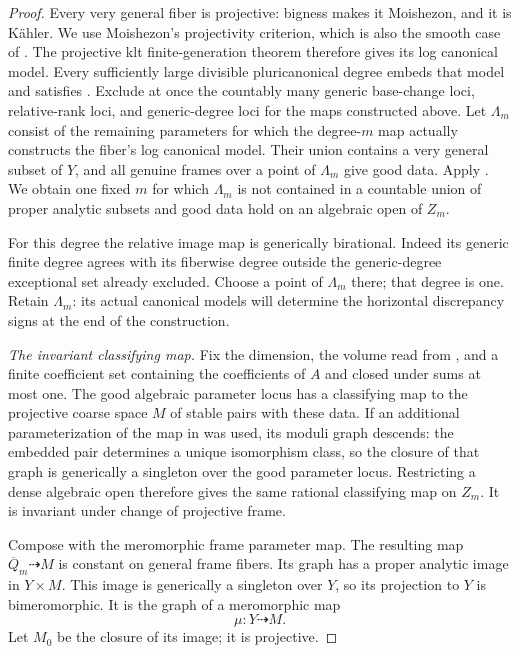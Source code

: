 \begin{proof}
Every very general fiber is projective: bigness makes it Moishezon,
and it is Kähler. We use Moishezon's projectivity criterion, which
is also the smooth case of \cite[Theorem~6]{NamikawaProjectivity}.
The projective klt finite-generation theorem
\cite[Theorem~1.1 and its consequences]{BCHM} therefore gives its log
canonical model.  Every sufficiently large divisible pluricanonical
degree embeds that model and satisfies
.  Exclude at once the countably
many generic base-change loci, relative-rank loci, and generic-degree
loci for the maps constructed above.  Let \(\Lambda_m\) consist of
the remaining parameters for which the degree-\(m\) map actually
constructs the fiber's log canonical model.
Their union contains a very general subset of \(Y\), and all genuine
frames over a point of \(\Lambda_m\) give good data.
Apply .  We obtain one fixed \(m\) for which
\(\Lambda_m\) is not contained in a countable union of proper analytic
subsets and good data hold on an algebraic open of \(Z_m\).

For this degree the relative image map is generically birational.
Indeed its generic finite degree agrees with its fiberwise degree
outside the generic-degree exceptional set already excluded.
Choose a point of \(\Lambda_m\) there; that degree is one.
Retain \(\Lambda_m\): its actual canonical models will determine the
horizontal discrepancy signs at the end of the construction.

\emph{The invariant classifying map.}
Fix the dimension, the volume read from
, and a finite coefficient set
containing the coefficients of \(A\) and closed under sums at most one.
The good algebraic parameter locus has a classifying map to the
projective coarse space \(M\) of stable pairs with these data.
If an additional parameterization of the map in
 was used, its moduli graph descends:
the embedded pair determines a unique isomorphism class, so the
closure of that graph is generically a singleton over the good
parameter locus.  Restricting a dense algebraic open therefore gives
the same rational classifying map on \(Z_m\).
It is invariant under change of projective frame.

Compose with the meromorphic frame parameter map.
The resulting map \(\overline Q_m\dashrightarrow M\) is constant
on general frame fibers.  Its graph has a proper analytic image
in \(Y\times M\).  This image is generically a singleton over \(Y\),
so its projection to \(Y\) is bimeromorphic.  It is the graph of
a meromorphic map
\[
  \mu\colon Y\dashrightarrow M.
\]
Let \(M_0\) be the closure of its image; it is projective.


\end{proof}
